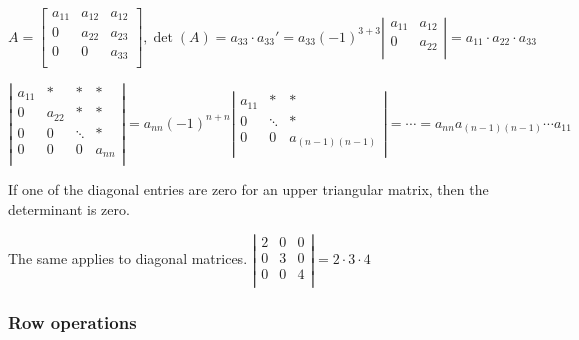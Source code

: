 \documentclass[
]{article}
\begin{document}
$$A = \begin{bmatrix}
a_{11} & a_{12} & a_{12} \\
0 & a_{22} & a_{23} \\
0 & 0 & a_{33} \\
\end{bmatrix},\det(A) = a_{33} \cdot a_{33}' = a_{33}( - 1)^{3 + 3}\left| \begin{matrix}
a_{11} & a_{12} \\
0 & a_{22} \\
\end{matrix} \right| = a_{11} \cdot a_{22} \cdot a_{33}$$

$$\left| \begin{matrix}
a_{11} & * & * & * \\
0 & a_{22} & * & * \\
0 & 0 & \ddots & * \\
0 & 0 & 0 & a_{nn} \\
\end{matrix} \right| = a_{nn}( - 1)^{n + n}\left| \begin{matrix}
a_{11} & * & * \\
0 & \ddots & * \\
0 & 0 & a_{(n - 1)(n - 1)} \\
\end{matrix} \right| = \cdots = a_{nn}a_{(n - 1)(n - 1)}\cdots a_{11}$$

If one of the diagonal entries are zero for an upper triangular matrix,
then the determinant is zero.

The same applies to diagonal matrices. $\left| \begin{matrix}
2 & 0 & 0 \\
0 & 3 & 0 \\
0 & 0 & 4 \\
\end{matrix} \right| = 2 \cdot 3 \cdot 4$


\subsubsection{Row operations}
\end{document}
